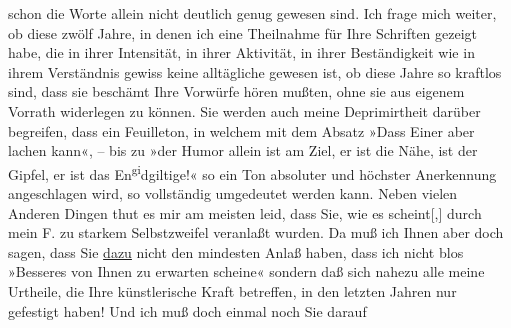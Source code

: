 \begin{ledgroupsized}[t]{13cm}
               schon die Worte allein nicht deutlich genug gewesen sind. Ich frage mich weiter, ob
               diese zwölf Jahre, in denen ich eine Theilnahme für Ihre Schriften gezeigt habe, die
               in ihrer Intensität, in ihrer Aktivität, in ihrer Beständigkeit wie in ihrem
               Verständnis gewiss keine alltägliche gewesen ist, ob diese Jahre so kraftlos sind,
               dass sie beschämt Ihre Vorwürfe hören mußten, ohne sie aus eigenem Vorrath widerlegen
               zu können.\pend
           \pstart
           Sie werden auch meine Deprimirtheit darüber begreifen, dass ein Feuilleton, in welchem mit dem Absatz »Dass Einer aber lachen kann«, –
               bis zu »der Humor allein ist am
                  Ziel, er ist die Nähe, ist der Gipfel, er ist das En\substVorne{}\textsuperscript{gi}\substDazwischen{}dg\substHinten{}iltige!« so ein Ton absoluter und höchster Anerkennung angeschlagen
               wird, so vollständig umgedeutet werden kann.\pend
           \pstart
           Neben vielen Anderen Dingen thut es mir am meisten leid, dass Sie, wie es
                  scheint{[},{]} durch mein F. zu starkem Selbstzweifel veranlaßt wurden. Da muß ich
               Ihnen aber doch sagen, dass Sie \uline{dazu} nicht den
               mindesten Anlaß haben, dass ich nicht blos »Besseres von Ihnen zu erwarten scheine«
               sondern daß sich nahezu alle meine Urtheile, die Ihre künstlerische Kraft betreffen,
               in den letzten Jahren nur gefestigt haben! Und ich muß {\pb}doch einmal noch Sie darauf

\end{ledgroupsized}
